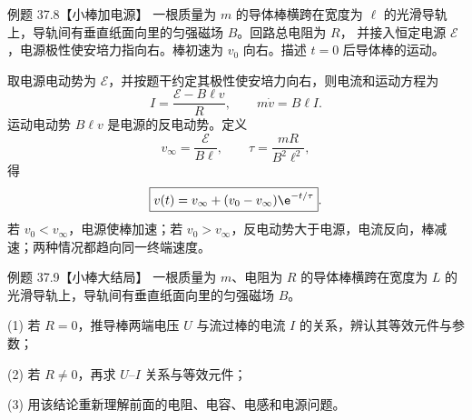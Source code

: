 \Needspace{0.12\textheight}
\begin{origexamplebox}{例题 37.8【小棒加电源】}
一根质量为 $m$ 的导体棒横跨在宽度为 $\ell$ 的光滑导轨上，导轨间有垂直纸面向里的匀强磁场 $B$。回路总电阻为 $R$，
并接入恒定电源 $\mathcal E$，电源极性使安培力指向右。棒初速为 $v_0$ 向右。描述 $t=0$ 后导体棒的运动。
\end{origexamplebox}

\begin{xesolution}
取电源电动势为 $\mathcal E$，并按题干约定其极性使安培力向右，则电流和运动方程为
\begin{equation}
  I=\frac{\mathcal E-B\ell v}{R},
  \qquad
  m\dot v=B\ell I.
\end{equation}
运动电动势 $B\ell v$ 是电源的反电动势。定义
\begin{equation}
  v_\infty=\frac{\mathcal E}{B\ell},
  \qquad \tau=\frac{mR}{B^2\ell^2},
\end{equation}
得
\begin{equation}
  \boxed{v(t)=v_\infty+(v_0-v_\infty)\e^{-t/\tau}}.
\end{equation}
若 $v_0<v_\infty$，电源使棒加速；若 $v_0>v_\infty$，反电动势大于电源，电流反向，棒减速；两种情况都趋向同一终端速度。

\rodSourceDiagram
\end{xesolution}

\Needspace{0.12\textheight}
\begin{origexamplebox}{例题 37.9【小棒大结局】}
一根质量为 $m$、电阻为 $R$ 的导体棒横跨在宽度为 $L$ 的光滑导轨上，导轨间有垂直纸面向里的匀强磁场 $B$。

(1) 若 $R=0$，推导棒两端电压 $U$ 与流过棒的电流 $I$ 的关系，辨认其等效元件与参数；

(2) 若 $R\ne0$，再求 $U$--$I$ 关系与等效元件；

(3) 用该结论重新理解前面的电阻、电容、电感和电源问题。
\end{origexamplebox}

